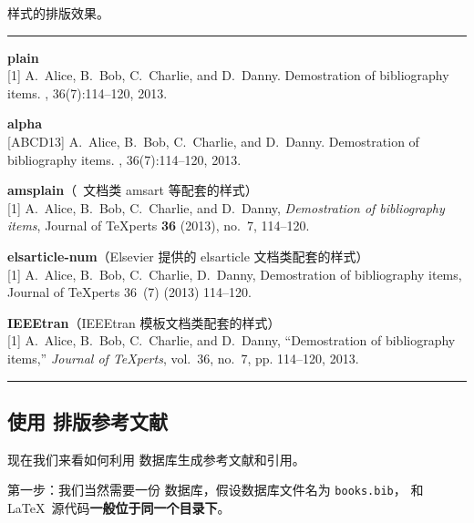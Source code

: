 \begin{table}[htp]
\caption{ 样式的排版效果。}\label{tbl:bibtex-style}
\hrule
\begin{trivlist}\item\relax
\textbf{plain}\\{}
[1] A.~Alice, B.~Bob, C.~Charlie, and D.~Danny.
\newblock Demostration of bibliography items.
, 36(7):114--120, 2013.

\medskip
\textbf{alpha}\\{}
[ABCD13] A.~Alice, B.~Bob, C.~Charlie, and D.~Danny.
\newblock Demostration of bibliography items.
, 36(7):114--120, 2013.

\medskip
\textbf{amsplain}（\AmS\ 文档类 \textsf{amsart} 等配套的样式）\\{}
[1] A.~Alice, B.~Bob, C.~Charlie, and D.~Danny, \emph{Demostration of bibliography
  items}, Journal of \TeX perts \textbf{36} (2013), no.~7, 114--120.

\medskip
\textbf{elsarticle-num}（Elsevier 提供的 \textsf{elsarticle} 文档类配套的样式）\\{}
[1] A.~Alice, B.~Bob, C.~Charlie, D.~Danny, Demostration of bibliography items,
  Journal of \TeX perts 36~(7) (2013) 114--120.

\medskip
\textbf{IEEEtran}（\textsf{IEEEtran} 模板文档类配套的样式）\\{}
[1] A.~Alice, B.~Bob, C.~Charlie, and D.~Danny, ``Demostration of bibliography
  items,'' \emph{Journal of \TeX perts}, vol.~36, no.~7, pp. 114--120, 2013.
\end{trivlist}
\hrule
\end{table}

\subsection{使用  排版参考文献}\label{subsec:bibtex-use}

现在我们来看如何利用  数据库生成参考文献和引用。

第一步：我们当然需要一份  数据库，假设数据库文件名为 \texttt{books.bib}，
和 \LaTeX\ 源代码\textbf{一般位于同一个目录下}。

